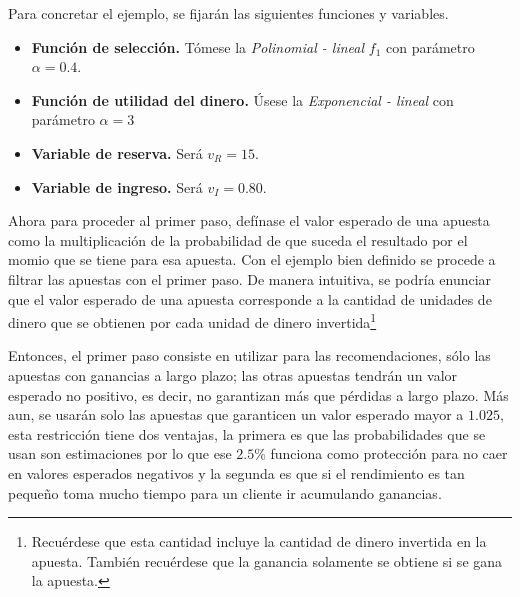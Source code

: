 Para concretar el ejemplo, se fijarán las siguientes funciones y variables.
\begin{itemize}
	\item \textbf{Función de selección.} Tómese la \emph{Polinomial - lineal} $f_1$ con parámetro $\alpha = 0.4$.
	\item \textbf{Función de utilidad del dinero.} Úsese la \emph{Exponencial - lineal} con parámetro $\alpha = 3$
	\item \textbf{Variable de reserva.} Será $v_R = 15$.
	\item \textbf{Variable de ingreso.} Será $v_I = 0.80$.
\end{itemize}
	

Ahora para proceder al primer paso, defínase el valor esperado de una apuesta como la multiplicación de la probabilidad de que suceda el resultado por el momio que se tiene para esa apuesta. 
Con el ejemplo bien definido se procede a filtrar las apuestas con el primer paso. De manera intuitiva, se podría enunciar que el valor esperado de una apuesta corresponde a la cantidad de unidades de dinero que se obtienen por cada unidad de dinero invertida\footnote{Recuérdese que esta cantidad incluye la cantidad de dinero invertida en la apuesta. También recuérdese que la ganancia solamente se obtiene si se gana la apuesta.}

Entonces, el primer paso consiste en utilizar para las recomendaciones, sólo las apuestas con ganancias a largo plazo; las otras apuestas tendrán un valor esperado no positivo, es decir, no garantizan más que pérdidas a largo plazo. Más aun, se usarán solo las apuestas que garanticen un valor esperado mayor a $1.025$, esta restricción tiene dos ventajas, la primera es que las probabilidades que se usan son estimaciones por lo que ese $2.5\%$ funciona como protección para no caer en valores esperados negativos y la segunda es que si el rendimiento es tan pequeño toma mucho tiempo para un cliente ir acumulando ganancias. 

